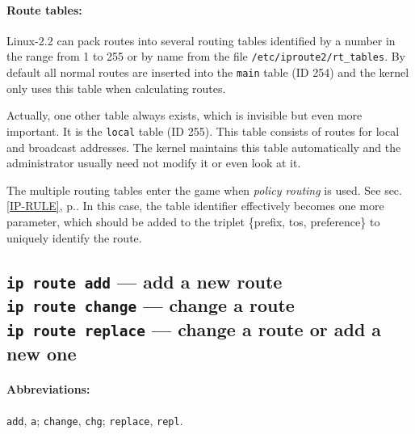 \paragraph{Route tables:} Linux-2.2 can pack routes into several routing
tables identified by a number in the range from 1 to 255 or by
name from the file \verb|/etc/iproute2/rt_tables|. By default all normal
routes are inserted into the \verb|main| table (ID 254) and the kernel only uses
this table when calculating routes.

Actually, one other table always exists, which is invisible but
even more important. It is the \verb|local| table (ID 255). This table
consists of routes for local and broadcast addresses. The kernel maintains
this table automatically and the administrator usually need not modify it
or even look at it.

The multiple routing tables enter the game when {\em policy routing\/}
is used. See sec.\ref{IP-RULE}, p.\pageref{IP-RULE}.
In this case, the table identifier effectively becomes
one more parameter, which should be added to the triplet
\{prefix, tos, preference\} to uniquely identify the route.


\subsection{{\tt ip route add} --- add a new route\\
	{\tt ip route change} --- change a route\\
	{\tt ip route replace} --- change a route or add a new one}
\label{IP-ROUTE-ADD}

\paragraph{Abbreviations:} \verb|add|, \verb|a|; \verb|change|, \verb|chg|;
	\verb|replace|, \verb|repl|.


